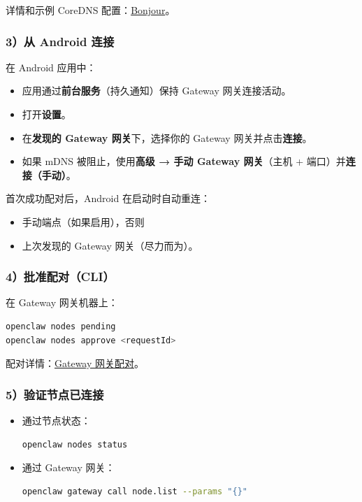详情和示例 CoreDNS 配置：\href{/gateway/bonjour}{Bonjour}。

\subsubsection{3）从 Android 连接}


在 Android 应用中：

\begin{itemize}
  \item 应用通过\textbf{前台服务}（持久通知）保持 Gateway 网关连接活动。
  \item 打开\textbf{设置}。
  \item 在\textbf{发现的 Gateway 网关}下，选择你的 Gateway 网关并点击\textbf{连接}。
  \item 如果 mDNS 被阻止，使用\textbf{高级 → 手动 Gateway 网关}（主机 + 端口）并\textbf{连接（手动）}。
\end{itemize}


首次成功配对后，Android 在启动时自动重连：

\begin{itemize}
  \item 手动端点（如果启用），否则
  \item 上次发现的 Gateway 网关（尽力而为）。
\end{itemize}


\subsubsection{4）批准配对（CLI）}


在 Gateway 网关机器上：

\begin{lstlisting}[language=bash]
openclaw nodes pending
openclaw nodes approve <requestId>
\end{lstlisting}


配对详情：\href{/gateway/pairing}{Gateway 网关配对}。

\subsubsection{5）验证节点已连接}


\begin{itemize}
  \item 通过节点状态：
\begin{lstlisting}[language=bash]
  openclaw nodes status
\end{lstlisting}

  \item 通过 Gateway 网关：
\begin{lstlisting}[language=bash]
  openclaw gateway call node.list --params "{}"
\end{lstlisting}

\end{itemize}


